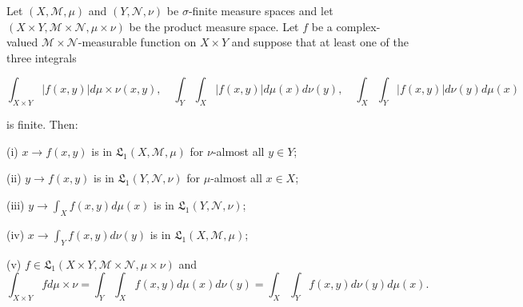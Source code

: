 Let $(X, \mathcal{M}, \mu)$ and $(Y, \mathcal{N}, \nu)$ be $\sigma$-finite measure spaces and let $(X \times Y, \mathcal{M} \times \mathcal{N}, \mu \times \nu)$ be the product measure space. Let $f$ be a complex-valued $\mathcal{M} \times \mathcal{N}$-measurable function on $X \times Y$ and suppose that at least one of the three integrals

$$\int_{X \times Y} |f(x, y)| d\mu \times \nu(x, y), \quad \int_Y \int_X |f(x, y)| d\mu(x) d\nu(y), \quad \int_X \int_Y |f(x, y)| d\nu(y) d\mu(x)$$

is finite. Then:

(i) $x \to f(x, y)$ is in $\mathfrak{L}_1(X, \mathcal{M}, \mu)$ for $\nu$-almost all $y \in Y$;

(ii) $y \to f(x, y)$ is in $\mathfrak{L}_1(Y, \mathcal{N}, \nu)$ for $\mu$-almost all $x \in X$;

(iii) $y \to \int_X f(x, y) d\mu(x)$ is in $\mathfrak{L}_1(Y, \mathcal{N}, \nu)$;

(iv) $x \to \int_Y f(x, y) d\nu(y)$ is in $\mathfrak{L}_1(X, \mathcal{M}, \mu)$;

(v) $f \in \mathfrak{L}_1(X \times Y, \mathcal{M} \times \mathcal{N}, \mu \times \nu)$ and
$$\int_{X \times Y} f d\mu \times \nu = \int_Y \int_X f(x, y) d\mu(x) d\nu(y) = \int_X \int_Y f(x, y) d\nu(y) d\mu(x).$$
